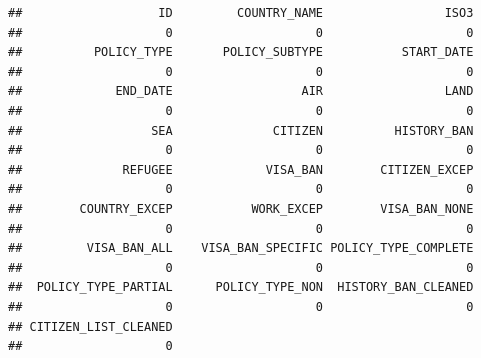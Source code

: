 \documentclass[]{article}
\begin{document}
\begin{verbatim}
##                   ID         COUNTRY_NAME                 ISO3 
##                    0                    0                    0 
##          POLICY_TYPE       POLICY_SUBTYPE           START_DATE 
##                    0                    0                    0 
##             END_DATE                  AIR                 LAND 
##                    0                    0                    0 
##                  SEA              CITIZEN          HISTORY_BAN 
##                    0                    0                    0 
##              REFUGEE             VISA_BAN        CITIZEN_EXCEP 
##                    0                    0                    0 
##        COUNTRY_EXCEP           WORK_EXCEP        VISA_BAN_NONE 
##                    0                    0                    0 
##         VISA_BAN_ALL    VISA_BAN_SPECIFIC POLICY_TYPE_COMPLETE 
##                    0                    0                    0 
##  POLICY_TYPE_PARTIAL      POLICY_TYPE_NON  HISTORY_BAN_CLEANED 
##                    0                    0                    0 
## CITIZEN_LIST_CLEANED 
##                    0
\end{verbatim}
\end{document}

